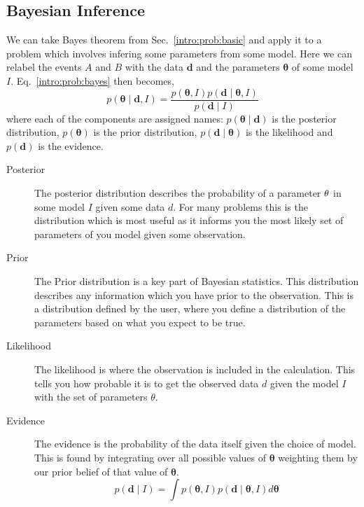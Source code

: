 \subsection{\label{intro:prob:bayes}Bayesian Inference}

We can take Bayes theorem from Sec.~\ref{intro:prob:basic} and apply it to a problem which involves infering some parameters from some model. Here we can relabel the events $A$ and $B$ with the data ${\bm d}$ and the parameters ${\bm \theta}$ of some model $I$.
Eq.~\ref{intro:prob:bayes} then becomes,
\begin{equation}
\label{intro:bayes:bayes}
p({\bm \theta} \mid {\bm d}, I) = \frac{p({\bm \theta}, I)p({\bm d} \mid {\bm \theta}, I)}{p({\bm d} \mid I)}
\end{equation}
where each of the components are assigned names: $p({\bm \theta} \mid {\bm d})$ is the posterior distribution, $p({\bm \theta})$ is the prior distribution,  $p({\bm d} \mid {\bm \theta})$ is the likelihood and $p({\bm d})$ is the evidence.

\begin{description}
\item [Posterior]
The posterior distribution describes the probability of a parameter ${\bf \theta}$ in some model $I$ given some data $d$. For many problems this is the distribution which is most useful as it informs you the most likely set of parameters of you model given some observation.
\item [Prior]
The Prior distribution is a key part of Bayesian statistics. This distribution describes any information which you have prior to the observation. This is a distribution defined by the user, where you define a distribution of the parameters based on what you expect to be true.
\item [Likelihood]
The likelihood is where the observation is included in the calculation. This tells you how probable it is to get the observed data $d$ given the model $I$ with the set of parameters $\theta$. 
\item [Evidence]
The evidence is the probability of the data itself given the choice of model. This is found by integrating over all possible values of ${\bm \theta}$ weighting them by our prior belief of that value of ${\bm \theta}$.
\begin{equation}
\label{intro:bayes:evidence}
    p({\bm d} \mid I) = \int p({\bm \theta}, I)p({\bm d} \mid {\bm \theta}, I) d{\bm \theta}
\end{equation}
\end{description}

